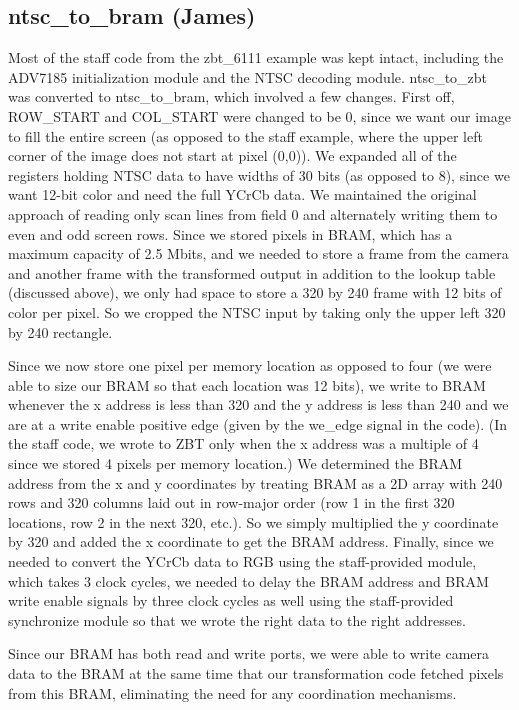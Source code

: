 \documentclass{article}
\begin{document}
\subsection{ntsc\_to\_bram (James)}
Most of the staff code from the zbt\_6111 example was kept intact, including the ADV7185 initialization module and the NTSC decoding module. ntsc\_to\_zbt was converted to ntsc\_to\_bram, which involved a few changes. First off, ROW\_START and COL\_START were changed to be 0, since we want our image to fill the entire screen (as opposed to the staff example, where the upper left corner of the image does not start at pixel (0,0)). We expanded all of the registers holding NTSC data to have widths of 30 bits (as opposed to 8), since we want 12-bit color and need the full YCrCb data. We maintained the original approach of reading only scan lines from field 0 and alternately writing them to even and odd screen rows. Since we stored pixels in BRAM, which has a maximum capacity of 2.5 Mbits, and we needed to store a frame from the camera and another frame with the transformed output in addition to the lookup table (discussed above), we only had space to store a 320 by 240 frame with 12 bits of color per pixel. So we cropped the NTSC input by taking only the upper left 320 by 240 rectangle.

Since we now store one pixel per memory location as opposed to four (we were able to size our BRAM so that each location was 12 bits), we write to BRAM whenever the x address is less than 320 and the y address is less than 240 and we are at a write enable positive edge (given by the we\_edge signal in the code). (In the staff code, we wrote to ZBT only when the x address was a multiple of 4 since we stored 4 pixels per memory location.) We determined the BRAM address from the x and y coordinates by treating BRAM as a 2D array with 240 rows and 320 columns laid out in row-major order (row 1 in the first 320 locations, row 2 in the next 320, etc.). So we simply multiplied the y coordinate by 320 and added the x coordinate to get the BRAM address. Finally, since we needed to convert the YCrCb data to RGB using the staff-provided module, which takes 3 clock cycles, we needed to delay the BRAM address and BRAM write enable signals by three clock cycles as well using the staff-provided synchronize module so that we wrote the right data to the right addresses.

Since our BRAM has both read and write ports, we were able to write camera data to the BRAM at the same time that our transformation code fetched pixels from this BRAM, eliminating the need for any coordination mechanisms.
\end{document}
